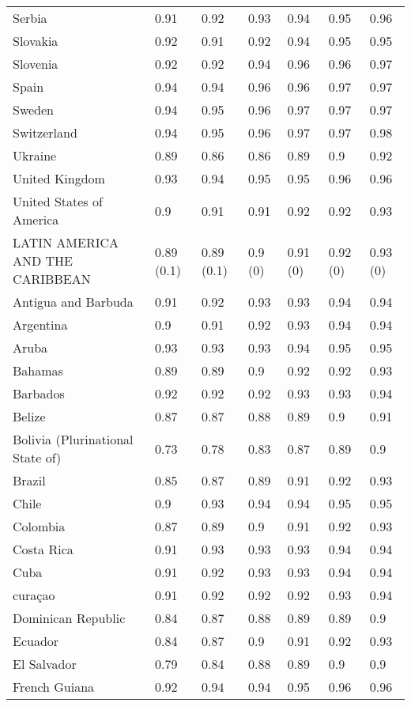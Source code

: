 \begin{longtable}[t]{lllllll}
Serbia & 0.91 & 0.92 & 0.93 & 0.94 & 0.95 & 0.96\\
Slovakia & 0.92 & 0.91 & 0.92 & 0.94 & 0.95 & 0.95\\
Slovenia & 0.92 & 0.92 & 0.94 & 0.96 & 0.96 & 0.97\\
Spain & 0.94 & 0.94 & 0.96 & 0.96 & 0.97 & 0.97\\
Sweden & 0.94 & 0.95 & 0.96 & 0.97 & 0.97 & 0.97\\
Switzerland & 0.94 & 0.95 & 0.96 & 0.97 & 0.97 & 0.98\\
Ukraine & 0.89 & 0.86 & 0.86 & 0.89 & 0.9 & 0.92\\
United Kingdom & 0.93 & 0.94 & 0.95 & 0.95 & 0.96 & 0.96\\
United States of America & 0.9 & 0.91 & 0.91 & 0.92 & 0.92 & 0.93\\
LATIN AMERICA AND THE CARIBBEAN & 0.89 (0.1) & 0.89 (0.1) & 0.9 (0) & 0.91 (0) & 0.92 (0) & 0.93 (0)\\
Antigua and Barbuda & 0.91 & 0.92 & 0.93 & 0.93 & 0.94 & 0.94\\
Argentina & 0.9 & 0.91 & 0.92 & 0.93 & 0.94 & 0.94\\
Aruba & 0.93 & 0.93 & 0.93 & 0.94 & 0.95 & 0.95\\
Bahamas & 0.89 & 0.89 & 0.9 & 0.92 & 0.92 & 0.93\\
Barbados & 0.92 & 0.92 & 0.92 & 0.93 & 0.93 & 0.94\\
Belize & 0.87 & 0.87 & 0.88 & 0.89 & 0.9 & 0.91\\
Bolivia (Plurinational State of) & 0.73 & 0.78 & 0.83 & 0.87 & 0.89 & 0.9\\
Brazil & 0.85 & 0.87 & 0.89 & 0.91 & 0.92 & 0.93\\
Chile & 0.9 & 0.93 & 0.94 & 0.94 & 0.95 & 0.95\\
Colombia & 0.87 & 0.89 & 0.9 & 0.91 & 0.92 & 0.93\\
Costa Rica & 0.91 & 0.93 & 0.93 & 0.93 & 0.94 & 0.94\\
Cuba & 0.91 & 0.92 & 0.93 & 0.93 & 0.94 & 0.94\\
curaçao & 0.91 & 0.92 & 0.92 & 0.92 & 0.93 & 0.94\\
Dominican Republic & 0.84 & 0.87 & 0.88 & 0.89 & 0.89 & 0.9\\
Ecuador & 0.84 & 0.87 & 0.9 & 0.91 & 0.92 & 0.93\\
El Salvador & 0.79 & 0.84 & 0.88 & 0.89 & 0.9 & 0.9\\
French Guiana & 0.92 & 0.94 & 0.94 & 0.95 & 0.96 & 0.96\\

\end{longtable}
